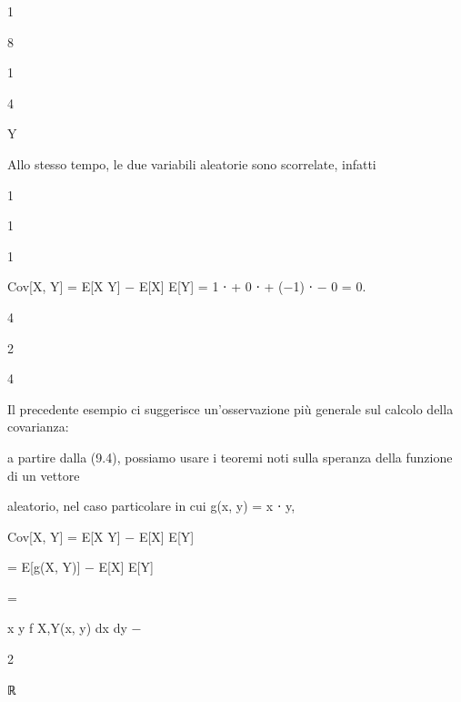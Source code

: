 \documentclass[a4paper,portrait,12pt]{article}
\begin{document}
1


8


1


4





\begin{flushleft}
Y
\end{flushleft}





\begin{flushleft}
Allo stesso tempo, le due variabili aleatorie sono scorrelate, infatti
\end{flushleft}


1


1


1


\begin{flushleft}
Cov[X, Y] = E[X Y] $-$ E[X] E[Y] = 1 ⋅ + 0 ⋅ + ($-$1) ⋅ $-$ 0 = 0.
\end{flushleft}


4


2


4


\begin{flushleft}
Il precedente esempio ci suggerisce un'osservazione più generale sul calcolo della covarianza:
\end{flushleft}


\begin{flushleft}
a partire dalla (9.4), possiamo usare i teoremi noti sulla speranza della funzione di un vettore
\end{flushleft}


\begin{flushleft}
aleatorio, nel caso particolare in cui g(x, y) = x ⋅ y,
\end{flushleft}


\begin{flushleft}
Cov[X, Y] = E[X Y] $-$ E[X] E[Y]
\end{flushleft}


\begin{flushleft}
= E[g(X, Y)] $-$ E[X] E[Y]
\end{flushleft}


=


\begin{flushleft}
x y f X,Y(x, y) dx dy $-$
\end{flushleft}


2


\begin{flushleft}
ℝ
\end{flushleft}
\end{document}
